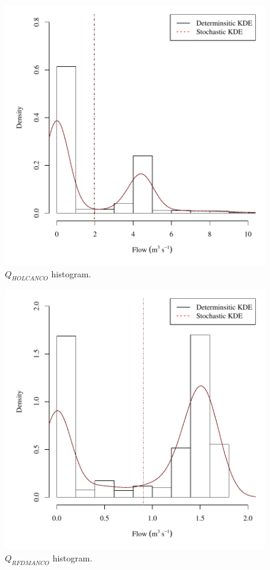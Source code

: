 \begin{center}
\begin{figure}[htbp]
	\includegraphics[width=6in]{"Figures/Results_USR/V density qHOL"}
	\caption{$Q_{HOLCANCO}$ histogram.}
\end{figure}
\end{center}
\newpage

\begin{center}
\begin{figure}[htbp]
	\includegraphics[width=6in]{"Figures/Results_USR/V density qRFD"}
	\caption{$Q_{RFDMANCO}$ histogram.}
\end{figure}
\end{center}
\newpage

